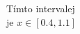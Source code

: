 \documentclass[preview]{standalone}
\begin{document}
\begin{center}
Tímto intervalej\\ je $x \in [0.4,1.1]$
\end{center}
\end{document}
